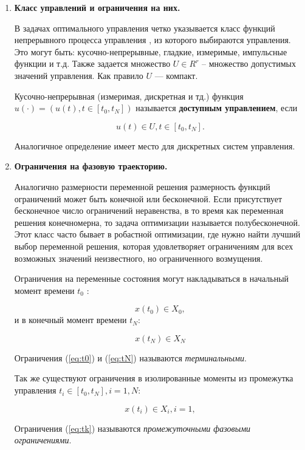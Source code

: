 \begin{enumerate}
    \item \textbf{Класс управлений и ограничения на них.}
    
    В задачах оптимального управления четко указывается класс функций  непрерывного процесса управления , из которого выбираются управления. Это могут быть: кусочно-непрерывные, гладкие, измеримые,  импульсные функции и т.д. Также задается множество $U \in R^r$ -- множество допустимых значений управления. Как правило $U$ — компакт.
    
    Кусочно-непрерывная (измеримая, дискретная и тд.) функция $u(·) = (u(t), t \in [t_0 , t_N ])$ называется \textbf{доступным управлением}, если 

$$u(t) \in U, t \in [t_0 , t_N].$$

Аналогичное определение имеет место для дискретных систем управления.


    \item \textbf{Ограничения на фазовую траекторию.}


Аналогично размерности переменной решения размерность функций ограничений может быть конечной или бесконечной. Если присутствует бесконечное число ограничений неравенства, в то время как переменная решения конечномерна, то задача оптимизации называется полубесконечной. Этот класс часто бывает в робастной оптимизации, где нужно найти лучший выбор переменной решения, которая удовлетворяет ограничениям для всех возможных значений неизвестного, но ограниченного возмущения.

 Ограничения на переменные состояния могут накладываться в начальный момент времени $t_0$ :

\begin{equation}
	x(t_0) \in X_0,
	 \label{eq:t0}
\end{equation}
и в конечный момент времени $t_N$:

\begin{equation} 
	x(t_N) \in X_N
	\label{eq:tN}
\end{equation}

Ограничения (\ref{eq:t0}) и (\ref{eq:tN}) называются \textit{терминальными}. 

Так же существуют ограничения в изолированные моменты из промежутка управления $t_i \in [t_0 , t_N], i = 1, N$:

\begin{equation} 
	x(t_i) \in X_i , i = 1, 
	\label{eq:tk}
\end{equation}

Ограничения (\ref{eq:tk}) называются \textit{промежуточными фазовыми ограничениями}.


\end{enumerate}
